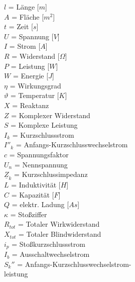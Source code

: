 \documentclass[11pt, a4paper, draft, fleqn, twocolumn]{article}
\numberwithin{equation}{subsection}
\begin{document}
    \noindent
    $l$ = Länge [$m$] \\
    $A$ = Fläche [$m^2$] \\
    $t$ = Zeit [$s$] \\
    $U$ = Spannung [$V$] \\
    $I$ = Strom [$A$] \\
    $R$ = Widerstand [$\Omega$] \\
    $P$ = Leistung [$W$] \\
    $W$ = Energie [$J$] \\
    $\eta$ = Wirkungsgrad \\
    $\vartheta$ = Temperatur [$K$]\\
    $X$ = Reaktanz \\
    $Z$ = Komplexer Widerstand \\
    $S$ = Komplexe Leistung \\
    $I_k$ = Kurzschlussstrom \\
    $I''_k$ = Anfangs-Kurzschlusswechselstrom \\
    $c$ = Spannungsfaktor \\
    $U_n$ = Nennspannung \\
    $\underline{Z}_k$ = Kurzschlussimpedanz \\
    $L$ = Induktivität [$H$] \\
    $C$ = Kapazität [$F$] \\
    $Q$ = elektr. Ladung [$As$] \\
    $\kappa$ = Stoßziffer \\
    $R_{tot}$ = Totaler Wirkwiderstand \\
    $X_{tot}$ = Totaler Blindwiderstand \\
    $i_p$ = Stoßkurzschlussstrom \\
    $I_b$ = Ausschaltwechselstrom \\
    $S_k''$ = Anfangs-Kurzschlusswechselstrom- \\
    \indent \hspace{1.3em} leistung \\
    
\end{document}
